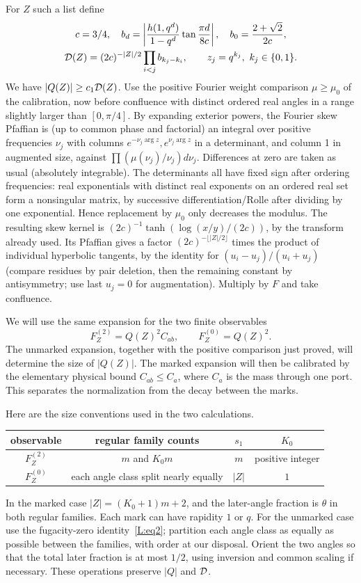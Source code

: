 \documentclass[11pt]{article}
\numberwithin{equation}{section}
\theoremstyle{definition}\newtheorem{definition}[theorem]{Definition}
\theoremstyle{remark}\newtheorem{remark}[theorem]{Remark}
\begin{document}
For \(Z\) such a list define
\[
\begin{gathered}
 c=3/4,\quad b_d=\left|\frac{h(1,q^d)}{1-q^d}\tan\frac{\pi d}{8c}\right|,
 \quad b_0=\frac{2+\sqrt2}{2c},\\
 {\cal D}(Z)=(2c)^{-|Z|/2}\prod_{i<j} b_{k_j-k_i},\qquad z_j=q^{k_j},\ k_j\in\{0,1\}.
\end{gathered}
\]
We have \(|Q(Z)|\ge c_1{\cal D}(Z)\). Use the positive Fourier weight comparison \(\mu\ge\mu_0\) of the calibration, now before confluence with distinct ordered real angles in a range slightly larger than \([0,\pi/4]\). By expanding exterior powers, the Fourier skew Pfaffian is (up to common phase and factorial) an integral over positive frequencies \(\nu_j\) with columns \(e^{-\nu_j\arg z},e^{\nu_j\arg z}\) in a determinant, and column 1 in augmented size, against \(\prod(\mu(\nu_j)/\nu_j)d\nu_j\). Differences at zero are taken as usual (absolutely integrable). The determinants all have fixed sign after ordering frequencies: real exponentials with distinct real exponents on an ordered real set form a nonsingular matrix, by successive differentiation/Rolle after dividing by one exponential. Hence replacement by \(\mu_0\) only decreases the modulus. The resulting skew kernel is \((2c)^{-1}\tanh(\log(x/y)/(2c))\), by the transform already used. Its Pfaffian gives a factor \((2c)^{-\lfloor |Z|/2\rfloor}\) times the product of individual hyperbolic tangents, by the identity for \((u_i-u_j)/(u_i+u_j)\) (compare residues by pair deletion, then the remaining constant by antisymmetry; use last \(u_j=0\) for augmentation). Multiply by \(F\) and take confluence.

We will use the same expansion for the two finite observables
\[
 F_Z^{(2)}=Q(Z)^2C_{ab},\qquad F_Z^{(0)}=Q(Z)^2.
\]
The unmarked expansion, together with the positive comparison just proved,
will determine the size of $|Q(Z)|$. The marked expansion will then be
calibrated by the elementary physical bound $C_{ab}\le C_a$, where $C_a$
is the mass through one port. This separates the normalization from the
decay between the marks.

Here are the size conventions used in the two calculations.
\begin{center}
\begin{tabular}{c|c|c|c}
 observable & regular family counts & $s_1$ & $K_0$\\\hline
 $F_Z^{(2)}$ & $m$ and $K_0m$ & $m$ & positive integer\\
 $F_Z^{(0)}$ & each angle class split nearly equally & $|Z|$ & $1$
\end{tabular}
\end{center}
In the marked case $|Z|=(K_0+1)m+2$, and the later-angle fraction is
$\theta$ in both regular families. Each mark can have rapidity $1$ or $q$.
For the unmarked case use the fugacity-zero identity~\eqref{L:eq2};
partition each angle class as equally as possible between the families,
with order at our disposal. Orient the two angles so that the total later
fraction is at most $1/2$, using inversion and common scaling if necessary.
These operations preserve $|Q|$ and ${\cal D}$.
\end{document}
